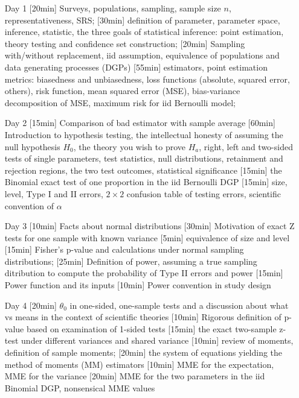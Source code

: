 \begin{enumerate}
\item[Day 1] [20min] Surveys, populations, sampling, sample size $n$, representativeness, SRS; [30min] definition of parameter, parameter space, inference, statistic, the three goals of statistical inference: point estimation, theory testing and confidence set construction; [20min] Sampling with/without replacement, iid assumption, equivalence of populations and data generating processes (DGPs) [55min] estimators, point estimation metrics: biasedness and unbiasedness, loss functions (absolute, squared error, others), risk function, mean squared error (MSE), bias-variance decomposition of MSE, maximum risk for iid Bernoulli model; 

\item[Day 2] [15min] Comparison of bad estimator with sample average [60min] Introduction to hypothesis testing, the intellectual honesty of assuming the null hypothesis $H_0$, the theory you wish to prove $H_a$, right, left and two-sided tests of single parameters, test statistics, null distributions, retainment and rejection regions, the two test outcomes, statistical significance [15min] the Binomial exact test of one proportion in the iid Bernoulli DGP [15min] size, level, Type I and II errors, $2 \times 2$ confusion table of testing errors, scientific convention of $\alpha$

\item[Day 3] [10min] Facts about normal distributions [30min] Motivation of exact Z tests for one sample with known variance [5min] equivalence of size and level [15min] Fisher's p-value and calculations under normal sampling distributions; [25min] Definition of power, assuming a true sampling ditribution to compute the probability of Type II errors and power [15min] Power function and its inputs [10min] Power convention in study design


\item[Day 4] [20min] $\theta_0$ in one-sided, one-sample tests and a discussion about what  vs  means in the context of scientific theories [10min] Rigorous definition of p-value based on examination of 1-sided tests [15min] the exact two-sample z-test under different variances and shared variance [10min] review of moments, definition of sample moments; [20min] the system of equations yielding the method of moments (MM) estimators [10min] MME for the expectation, MME for the variance [20min] MME for the two parameters in the iid Binomial DGP, nonsensical MME values


\end{enumerate}
